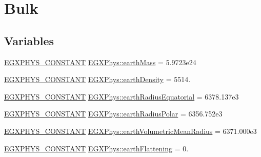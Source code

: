 \hypertarget{group___e_g_x_phys-_constants-_astrophysics-_solar_system-_earth-_bulk}{}\section{Bulk}
\label{group___e_g_x_phys-_constants-_astrophysics-_solar_system-_earth-_bulk}
\subsection*{Variables}
\begin{DoxyCompactItemize}
\item 
\mbox{\hyperlink{group___e_g_x_phys-_constants-_macros_ga76980d288494ce1714c9ac68a95ba702}{E\+G\+X\+P\+H\+Y\+S\+\_\+\+C\+O\+N\+S\+T\+A\+NT}} \mbox{\hyperlink{group___e_g_x_phys-_constants-_astrophysics-_solar_system-_earth-_bulk_ga7d335a700fce4dda5baa19d2b2ed14ba}{E\+G\+X\+Phys\+::earth\+Mass}} = 5.\+9723e24
\item 
\mbox{\hyperlink{group___e_g_x_phys-_constants-_macros_ga76980d288494ce1714c9ac68a95ba702}{E\+G\+X\+P\+H\+Y\+S\+\_\+\+C\+O\+N\+S\+T\+A\+NT}} \mbox{\hyperlink{group___e_g_x_phys-_constants-_astrophysics-_solar_system-_earth-_bulk_ga7ff84de93ff11190d3b84d8ff8525c04}{E\+G\+X\+Phys\+::earth\+Density}} = 5514.
\item 
\mbox{\hyperlink{group___e_g_x_phys-_constants-_macros_ga76980d288494ce1714c9ac68a95ba702}{E\+G\+X\+P\+H\+Y\+S\+\_\+\+C\+O\+N\+S\+T\+A\+NT}} \mbox{\hyperlink{group___e_g_x_phys-_constants-_astrophysics-_solar_system-_earth-_bulk_ga44f4484850300ac8c26488514864fb47}{E\+G\+X\+Phys\+::earth\+Radius\+Equatorial}} = 6378.\+137e3
\item 
\mbox{\hyperlink{group___e_g_x_phys-_constants-_macros_ga76980d288494ce1714c9ac68a95ba702}{E\+G\+X\+P\+H\+Y\+S\+\_\+\+C\+O\+N\+S\+T\+A\+NT}} \mbox{\hyperlink{group___e_g_x_phys-_constants-_astrophysics-_solar_system-_earth-_bulk_gaa5213443d0c8577a2bfef89193346764}{E\+G\+X\+Phys\+::earth\+Radius\+Polar}} = 6356.\+752e3
\item 
\mbox{\hyperlink{group___e_g_x_phys-_constants-_macros_ga76980d288494ce1714c9ac68a95ba702}{E\+G\+X\+P\+H\+Y\+S\+\_\+\+C\+O\+N\+S\+T\+A\+NT}} \mbox{\hyperlink{group___e_g_x_phys-_constants-_astrophysics-_solar_system-_earth-_bulk_ga403e9a295cb108232c7a041dde01d02b}{E\+G\+X\+Phys\+::earth\+Volumetric\+Mean\+Radius}} = 6371.\+000e3
\item 
\mbox{\hyperlink{group___e_g_x_phys-_constants-_macros_ga76980d288494ce1714c9ac68a95ba702}{E\+G\+X\+P\+H\+Y\+S\+\_\+\+C\+O\+N\+S\+T\+A\+NT}} \mbox{\hyperlink{group___e_g_x_phys-_constants-_astrophysics-_solar_system-_earth-_bulk_gaabbf1158b0f8e2f9545c8e4dc9b2e2bd}{E\+G\+X\+Phys\+::earth\+Flattening}} = 0.

\end{DoxyCompactItemize}
